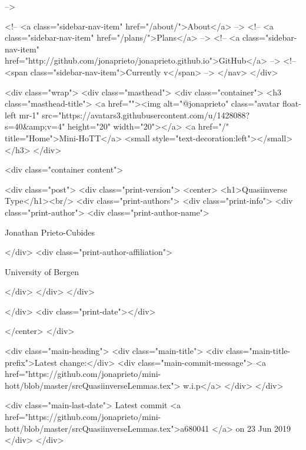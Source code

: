       
     -->

    <!-- <a class="sidebar-nav-item" href="/about/">About</a> -->
    <!-- <a class="sidebar-nav-item" href="/plans/">Plans</a> -->
    <!-- <a class="sidebar-nav-item" href="http://github.com/jonaprieto/jonaprieto.github.io">GitHub</a> -->
    <!-- <span class="sidebar-nav-item">Currently v</span> -->
  </nav>
</div>

    <div class="wrap">
      <div class="masthead">
        <div class="container">
          <h3 class="masthead-title">
            <a href=""><img alt="@jonaprieto" class="avatar float-left mr-1" src="https://avatars3.githubusercontent.com/u/1428088?s=40&amp;v=4" height="20" width="20"></a>
            <a href="/" title="Home">Mini-HoTT</a>
            <small style="text-decoration:left"></small>
          </h3>
        </div>
      
      <div class="container content">
        







<div class="post">
  <div class="print-version">
    <center>
      <h1>Quasiinverse Type</h1><br/>
        <div class="print-authors">
          <div class="print-info">
            <div class="print-author">
              <div class="print-author-name">
                
                  Jonathan Prieto-Cubides
                
              </div>
              <div class="print-author-affiliation">
                
                  University of Bergen
                
                </div>
            </div>
          </div>
          
          
        </div>
        <div class="print-date"></div>
        
        
    </center>
  </div>

  
  <div class="main-heading">
    <div class="main-title">
      <div class="main-title-prefix">Latest change:</div>
      <div class="main-commit-message">
            <a href="https://github.com/jonaprieto/mini-hott/blob/master/srcQuasiinverseLemmas.tex">
              w.i.p</a>
      </div>
    </div>

    <div class="main-last-date">
      Latest commit <a href="https://github.com/jonaprieto/mini-hott/blob/master/srcQuasiinverseLemmas.tex">a680041 </a> on  23 Jun 2019
    </div>
  </div>
  


